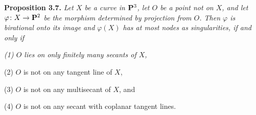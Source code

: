 {\medskip
\noindent\hypertarget{result-IV-3.7}{}\textbf{Proposition 3.7.} \emph{Let $X$ be a curve in $\mathbf{P}^3$, let $O$ be a point not on $X$, and let $\varphi\colon X\to\mathbf{P}^2$ be the morphism determined by projection from $O$. Then $\varphi$ is birational onto its image and $\varphi(X)$ has at most nodes as singularities, if and only if}
\par{\itshape\leftskip=11pt
\noindent\hypertarget{result-IV-3.7-1}{}(1) $O$ lies on only finitely many secants of $X$,

\noindent\hypertarget{result-IV-3.7-2}{}(2) $O$ is not on any tangent line of $X$,

\noindent\hypertarget{result-IV-3.7-3}{}(3) $O$ is not on any multisecant of $X$, and

\noindent\hypertarget{result-IV-3.7-4}{}(4) $O$ is not on any secant with coplanar tangent lines.\par}
}
